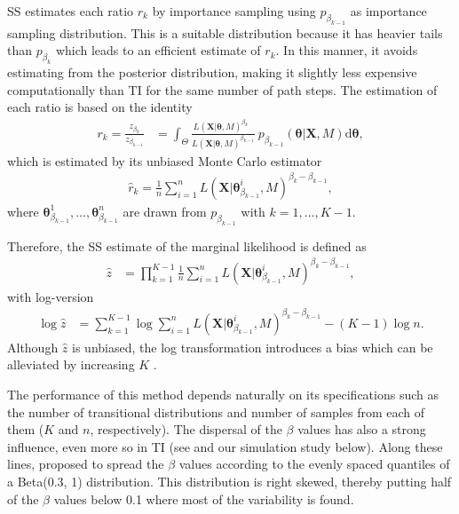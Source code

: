 \documentclass[aps,reprint,amsmath,amssymb,showpacs,showkeys]{revtex4-1}%
\begin{document}
SS estimates each ratio $r_k$ by importance sampling using $p_{\beta_{k-1}}$ as importance sampling distribution.  This is a suitable distribution because it has heavier tails than $p_{\beta_{k}}$ which leads to an efficient estimate of $r_k$.  In this manner, it avoids estimating from the posterior distribution, making it slightly less expensive computationally than TI for the same number of path steps.  The estimation of each ratio is based on the identity
\begin{align*}
r_k = \frac{z_{\beta_{k}}}{z_{\beta_{k-1}}} &= \int_{\Theta}\frac{L(\bm{X}|\bm{\theta},M)^{\beta_{k \quad}}}{L(\bm{X}|\bm{\theta},M)^{\beta_{k-1}}} \: p_{\beta_{k-1}}(\bm{\theta}|\bm{X},M) \text{d}\bm{\theta}, 
\end{align*}
which is estimated by its unbiased Monte Carlo estimator
\begin{align*}
\widehat{r}_k = \frac{1}{n} \sum_{i = 1}^{n}  L( \bm X | \bm{\theta}_{\!\beta_{k-1}}^{i}, M)^{\beta_{k}-\beta_{k-1}},
\end{align*}
where $\bm{\theta}_{\!\beta_{k-1}}^{1}, \dots, \bm{\theta}_{\!\beta_{k-1}}^{n}$ are drawn from $p_{\beta_{k-1}}$ with $k = 1, \dots, K-1$. 

Therefore,  the SS estimate of the marginal likelihood is defined as 
\begin{align*}
\widehat{z} &= \prod_{k=1}^{K-1}\frac{1}{n} \sum_{i = 1}^{n}  L( \bm X | \bm{\theta}_{\!\beta_{k-1}}^{i}, M)^{\beta_{k}-\beta_{k-1}},
\end{align*}
with log-version
\begin{align*}
\log\widehat{z} &= \sum_{k=1}^{K-1} \log \sum_{i = 1}^{n}  L( \bm X | \bm{\theta}_{\!\beta_{k-1}}^{i}, M)^{\beta_{k}-\beta_{k-1}} - (K-1) \log n.
\end{align*}
Although $\widehat{z}$ is unbiased, the log transformation introduces a bias which can be alleviated by increasing $K$ \citep{Xie:Lewis:Fan:Kuo:Chen:2011}.

The performance of this method depends naturally on its specifications such as the number of transitional distributions and number of samples from each of them ($K$ and $n$, respectively).  The dispersal of the $\beta$ values has also a strong influence, even more so in TI (see \cite{Xie:Lewis:Fan:Kuo:Chen:2011} and our simulation study below).  Along these lines, \cite{Xie:Lewis:Fan:Kuo:Chen:2011} proposed to spread the $\beta$ values according to the evenly spaced quantiles of a Beta(0.3, 1) distribution.  This distribution is right skewed, thereby putting half of the $\beta$ values below 0.1 where most of the variability  is found.    
\end{document}
